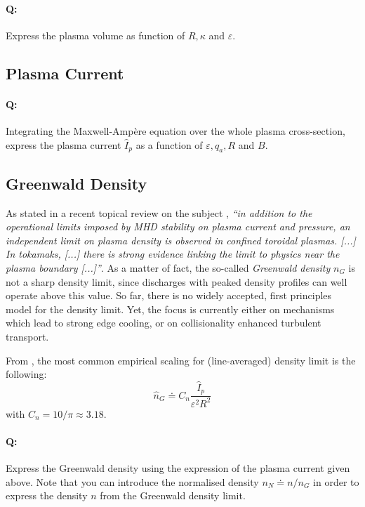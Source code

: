 \paragraph{Q:} Express the plasma volume as function of $R, \kappa$ and $\varepsilon$.

\subsection{Plasma Current}
\paragraph{Q:} Integrating the Maxwell-Ampère equation over the whole plasma cross-section, express the plasma current $\hat I_p$ as a function of $\varepsilon, q_a, R$ and $B$. 


\subsection{Greenwald Density}
As stated in a recent topical review on the subject \cite{Greenwald2002}, \emph{``in addition to the operational limits imposed by MHD stability on plasma current and pressure, an independent limit on plasma density is observed in confined toroidal plasmas. [...] In tokamaks, [...] there is strong evidence linking the limit to physics near the plasma boundary [...]''}. As a matter of fact, the so-called \textit{Greenwald density} $n_G$ is not a sharp density limit, since discharges with peaked density profiles can well operate above this value. So far, there is no widely accepted, first principles model for the density limit. Yet, the focus is currently either on mechanisms which lead to strong edge cooling, or on collisionality enhanced turbulent transport.

From \cite[eq.(14.146)]{Freidberg2007}, the most common empirical scaling for (line-averaged) density limit is the following:
\begin{equation}
\boxed{\hat n_G \doteq C_n \frac{\hat I_p}{\varepsilon^2 R^2}  }
\label{eqn:greenwald_density}
\end{equation}
with $C_n = 10/\pi \approx 3.18$.

\paragraph{Q:} Express the Greenwald density using the expression of the plasma current given above. Note that you can introduce the normalised density $n_N\doteq n/ n_G$ in order to express the density $n$ from the Greenwald density limit.

